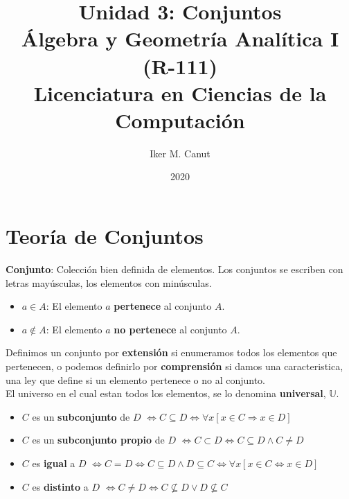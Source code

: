 \documentclass[11pt,a4paper]{article}
\author{Iker M. Canut}
\title{Unidad 3: Conjuntos\\\'Algebra y Geometr\'ia Anal\'itica I (R-111)\\Licenciatura en Ciencias de la Computaci\'on}
\date{2020}
\begin{document}
\maketitle
\newpage
\section{Teor\'ia de Conjuntos}
\noindent \textbf{Conjunto}: Colecci\'on bien definida de elementos. Los conjuntos se escriben con letras may\'usculas, los elementos con min\'usculas.
\begin{itemize}
\item $a \in A$: El elemento $a$ \textbf{pertenece} al conjunto $A$.
\item $a \not \in A$: El elemento $a$ \textbf{no pertenece} al conjunto $A$.
\end{itemize}
\noindent Definimos un conjunto por \textbf{extensi\'on} si enumeramos todos los elementos que pertenecen, o podemos definirlo por \textbf{comprensi\'on} si damos una caracteristica, una ley que define si un elemento pertenece o no al conjunto. \\ \noindent El universo en el cual estan todos los elementos, se lo denomina \textbf{universal}, $\mathbb{U}$.\\

\begin{itemize}
\item $C$ es un \textbf{subconjunto} de $D$ $\iff C \subseteq D \iff \forall x[x \in C \Rightarrow x \in D]$

\item $C$ es un \textbf{subconjunto propio} de $D$ $\iff C \subset D \iff C \subseteq D \land C \not = D$

\item $C$ es \textbf{igual} a $D$ $\iff C = D \iff C \subseteq D \land D \subseteq C \iff \forall x[x \in C \iff x \in D]$
\item $C$ es \textbf{distinto} a $D$ $\iff C \not = D \iff C \not \subseteq D \lor D \not \subseteq C$\\
\end{itemize}
\end{document}
